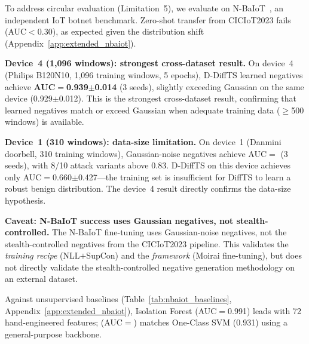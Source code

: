 To address circular evaluation (Limitation~5), we evaluate on
N-BaIoT~\cite{meidan2018n}, an independent IoT botnet benchmark.
Zero-shot transfer from CICIoT2023 fails (AUC$<$0.30), as expected
given the distribution shift (Appendix~\ref{app:extended_nbaiot}).

\textbf{Device~4 (1{,}096 windows): strongest cross-dataset result.}
On device~4 (Philips B120N10, 1{,}096 training windows, 5 epochs),
D-DiffTS learned negatives achieve \textbf{AUC$=$0.939$\pm$0.014} (3 seeds),
slightly exceeding Gaussian on the same device (0.929$\pm$0.012).
This is the strongest cross-dataset result, confirming that learned
negatives match or exceed Gaussian when adequate training data ($\geq$500
windows) is available.

\textbf{Device~1 (310 windows): data-size limitation.}
On device~1 (Danmini doorbell, 310 training windows), Gaussian-noise
negatives achieve AUC$=$\nbaiotAUC{} (3 seeds), with 8/10 attack
variants above 0.83.
D-DiffTS on this device achieves only AUC$=$0.660$\pm$0.427---the training
set is insufficient for DiffTS to learn a robust benign distribution.
The device~4 result directly confirms the data-size hypothesis.

\textbf{Caveat: N-BaIoT success uses Gaussian negatives, not stealth-controlled.}
The N-BaIoT fine-tuning uses Gaussian-noise negatives, not the
stealth-controlled negatives from the CICIoT2023 pipeline.
This validates the \emph{training recipe} (NLL$+$SupCon) and the
\emph{framework} (Moirai fine-tuning), but does not directly validate
the stealth-controlled negative generation methodology on an
external dataset.

Against unsupervised baselines (Table~\ref{tab:nbaiot_baselines},
Appendix~\ref{app:extended_nbaiot}), Isolation Forest (AUC$=$0.991) leads
with 72 hand-engineered features; \ours{} (AUC$=$\nbaiotAUC{}) matches
One-Class SVM (0.931) using a general-purpose backbone.

